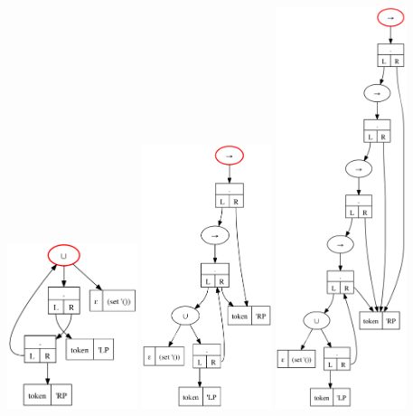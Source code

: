 \begin{center}
 \includegraphics[width=1.5in]{parens-step-0-c.png}
 \includegraphics[width=1.5in]{parens-step-2-c.png}
 \includegraphics[width=1.5in]{parens-step-4-c.png}
\end{center}

